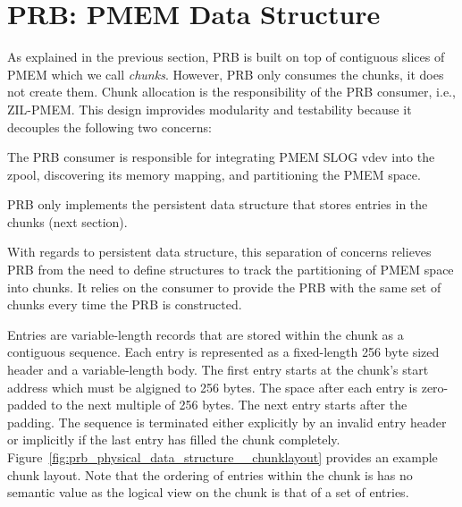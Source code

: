 \documentclass[12pt,a4paper,twoside]{book}
\begin{document}
\section{PRB: PMEM Data Structure}\label{di:prb:pmemdatastructure}
As explained in the previous section, PRB is built on top of contiguous slices of PMEM which we call \textit{chunks}.
However, PRB only consumes the chunks, it does not create them.
Chunk allocation is the responsibility of the PRB consumer, i.e., ZIL-PMEM.
This design improvides modularity and testability because it decouples the following two concerns:
\begin{description}[noitemsep,leftmargin=1.5cm,labelindent=1cm]
    \item[Resource Aquisition] The PRB consumer is responsible for integrating PMEM SLOG vdev into the zpool, discovering its memory mapping, and partitioning the PMEM space.
    \item[PMEM Data Structure] PRB only implements the persistent data structure that stores entries in the chunks (next section).
\end{description}
With regards to persistent data structure, this separation of concerns relieves PRB from the need to define structures to track the partitioning of PMEM space into chunks.
It relies on the consumer to provide the PRB with the same set of chunks every time the PRB is constructed.


Entries are variable-length records that are stored within the chunk as a contiguous sequence.
Each entry is represented as a fixed-length 256 byte sized header and a variable-length body.
The first entry starts at the chunk's start address which must be algigned to 256 bytes.
The space after each entry is zero-padded to the next multiple of 256 bytes.
The next entry starts after the padding.
The sequence is terminated either explicitly by an invalid entry header or implicitly if the last entry has filled the chunk completely.
Figure~\ref{fig:prb_physical_data_structure__chunklayout} provides an example chunk layout.
Note that the ordering of entries within the chunk is has no semantic value as the logical view on the chunk is that of a set of entries.
\end{document}
